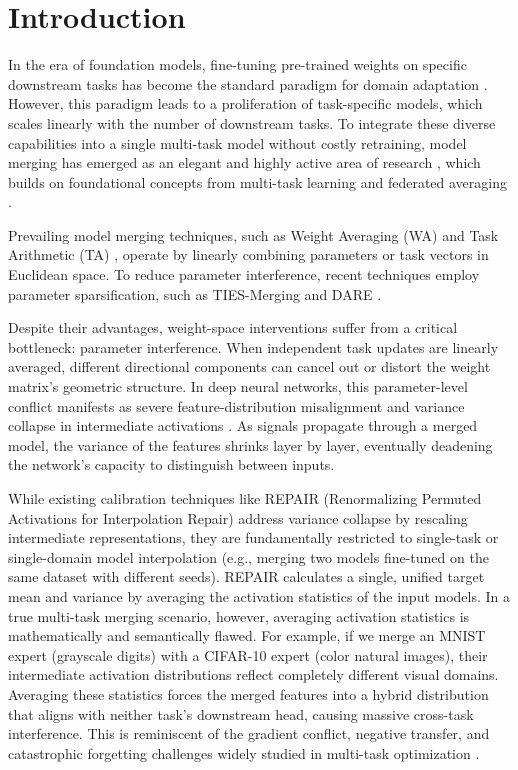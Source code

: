 \documentclass{article}
\theoremstyle{plain}
\theoremstyle{definition}
\theoremstyle{remark}
\begin{document}
\section{Introduction}
\label{intro}

In the era of foundation models, fine-tuning pre-trained weights on specific downstream tasks has become the standard paradigm for domain adaptation \cite{devlin2018bert, radford2021clip}. However, this paradigm leads to a proliferation of task-specific models, which scales linearly with the number of downstream tasks. To integrate these diverse capabilities into a single multi-task model without costly retraining, model merging has emerged as an elegant and highly active area of research \cite{wortsman2022soups, ilharco2022arithmetic}, which builds on foundational concepts from multi-task learning \cite{ruder2017overview} and federated averaging \cite{mcmahan2017communication}.

Prevailing model merging techniques, such as Weight Averaging (WA) \cite{wortsman2022soups} and Task Arithmetic (TA) \cite{ilharco2022arithmetic}, operate by linearly combining parameters or task vectors in Euclidean space. To reduce parameter interference, recent techniques employ parameter sparsification, such as TIES-Merging \cite{yadav2023ties} and DARE \cite{yu2024dare}. 

Despite their advantages, weight-space interventions suffer from a critical bottleneck: parameter interference. When independent task updates are linearly averaged, different directional components can cancel out or distort the weight matrix's geometric structure. In deep neural networks, this parameter-level conflict manifests as severe feature-distribution misalignment and variance collapse in intermediate activations \cite{jordan2022repair}. As signals propagate through a merged model, the variance of the features shrinks layer by layer, eventually deadening the network's capacity to distinguish between inputs.

While existing calibration techniques like REPAIR (Renormalizing Permuted Activations for Interpolation Repair) \cite{jordan2022repair} address variance collapse by rescaling intermediate representations, they are fundamentally restricted to single-task or single-domain model interpolation (e.g., merging two models fine-tuned on the same dataset with different seeds). REPAIR calculates a single, unified target mean and variance by averaging the activation statistics of the input models. In a true multi-task merging scenario, however, averaging activation statistics is mathematically and semantically flawed. For example, if we merge an MNIST expert (grayscale digits) with a CIFAR-10 expert (color natural images), their intermediate activation distributions reflect completely different visual domains. Averaging these statistics forces the merged features into a hybrid distribution that aligns with neither task's downstream head, causing massive cross-task interference. This is reminiscent of the gradient conflict, negative transfer, and catastrophic forgetting challenges widely studied in multi-task optimization \cite{wang2019characterizing, yu2020gradient, chen2018gradnorm, sener2018multi, fifty2021efficienting, misra2016cross, kirkpatrick2017overcoming}.
\end{document}
